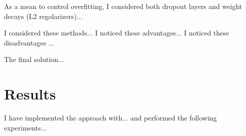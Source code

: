\documentclass[10pt,a4paper]{article}
\begin{document}
As a mean to control overfitting, I considered both dropout layers and weight decays (L2 regolarizers)...

I considered these methods... I noticed these advantages... I noticed these disadvantages ...

The final solution...

\section{Results}

I have implemented the approach with... and performed the following experiments...

%
%
\end{document}
